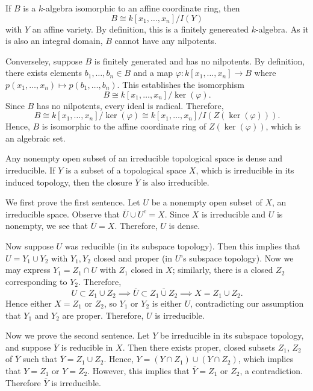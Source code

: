 \documentclass{hw_pset} %
\newcommand{\x}{x_1, \dots, x_n}    %
\renewcommand{\phi}{\varphi}
\begin{document}
\begin{solution}
    If $B$ is a $k$-algebra isomorphic to an affine coordinate ring, then 
    \[
        B \cong k[\x]/I(Y)
    \]
    with $Y$ an affine variety. By definition, this is a finitely genereated $k$-algebra.
    As it is also an integral domain, $B$ cannot have any nilpotents. 

    Converseley, suppose $B$ is finitely generated and has no nilpotents. By definition, 
    there exists elements $b_1, \dots, b_n \in B$ and a map $\phi: k[\x] \to B$ 
    where $p(\x) \mapsto p(b_1, \dots, b_n)$. This establishes the isomorphism 
    \[
        B \cong k[\x]/\ker(\phi).
    \]
    Since $B$ has no nilpotents, every ideal is radical. Therefore, 
    \[
        B \cong k[\x]/\ker(\phi) \cong k[\x]/I(Z(\ker(\phi))).
    \]
    Hence, $B$ is isomorphic to the affine coordinate ring of $Z(\ker(\phi))$, 
    which is an algebraic set.
\end{solution}

\begin{exercise}[1.6]
    Any nonempty open subset of an irreducible topological space is dense and
    irreducible.
    If $Y$ is a subset of a topological space $X$, which is irreducible in its
    induced topology, then the closure $\overline{Y}$ is also irreducible.
\end{exercise}

\begin{solution}
    We first prove the first sentence.
    Let $U$ be a nonempty open subset of $X$, an irreducible space. 
    Observe that $\overline{U} \cup U^c = X$. Since $X$ is irreducible and $U$ 
    is nonempty, we see that $\overline{U} = X$. Therefore, $U$ is dense.

    Now suppose $U$ was reducible (in its subspace topology). Then this implies that 
    $U = Y_1 \cup Y_2$ with $Y_1, Y_2$ closed and proper (in $U$'s subspace topology). 
    Now we may express $Y_1 = Z_1 \cap U$ with $Z_1$ closed in $X$; similarly, there is a closed $Z_2$ corresponding 
    to $Y_2$. Therefore, 
    \[
        U \subset Z_1 \cup Z_2 \implies \overline{U} \subset \overline{Z_1 \cup Z_2} \implies 
        X = Z_1 \cup Z_2.        
    \]
    Hence either $X = Z_1$ or $Z_2$, so $Y_1$ or $Y_2$ is either $U$, contradicting our 
    assumption that $Y_1$ and $Y_2$ are proper. Therefore, $U$ is irreducible. 

    Now we prove the second sentence. Let $Y$ be irreducible in its subspace topology, and 
    suppose $\overline{Y}$ is reducible in $X$. Then there exists proper, closed subsets 
    $Z_1$, $Z_2$ of $\overline{Y}$ such that $\overline{Y} = Z_1 \cup Z_2$. Hence, 
    $Y = (Y \cap Z_1) \cup (Y \cap Z_2)$, which implies that $Y = Z_1$ 
    or $Y = Z_2$. However, this implies that $\overline{Y} = Z_1$ or $Z_2$, a contradiction. 
    Therefore $\overline{Y}$ is irreducible. 

\end{solution}
\end{document}
